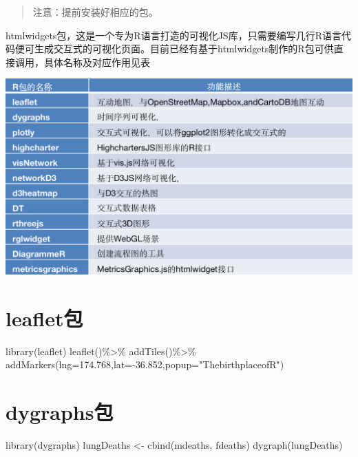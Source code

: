 \documentclass[
]{book}
\newenvironment{Shaded}{\begin{snugshade}}{\end{snugshade}}
\newcommand{\AttributeTok}[1]{\textcolor[rgb]{0.77,0.63,0.00}{#1}}
\newcommand{\FloatTok}[1]{\textcolor[rgb]{0.00,0.00,0.81}{#1}}
\newcommand{\FunctionTok}[1]{\textcolor[rgb]{0.00,0.00,0.00}{#1}}
\newcommand{\NormalTok}[1]{#1}
\newcommand{\OtherTok}[1]{\textcolor[rgb]{0.56,0.35,0.01}{#1}}
\newcommand{\SpecialCharTok}[1]{\textcolor[rgb]{0.00,0.00,0.00}{#1}}
\newcommand{\StringTok}[1]{\textcolor[rgb]{0.31,0.60,0.02}{#1}}
\begin{document}
\begin{quote}
注意：提前安装好相应的包。
\end{quote}

htmlwidgets包，这是一个专为R语言打造的可视化JS库，只需要编写几行R语言代码便可生成交互式的可视化页面。目前已经有基于htmlwidgets制作的R包可供直接调用，具体名称及对应作用见表

\includegraphics{figure/24.png}

\hypertarget{leafletux5305}{%
\section{leaflet包}\label{leafletux5305}}

\begin{Shaded}
\begin{Highlighting}[]
\FunctionTok{library}\NormalTok{(leaflet)}
\FunctionTok{leaflet}\NormalTok{()}\SpecialCharTok{\%\textgreater{}\%}
  \FunctionTok{addTiles}\NormalTok{()}\SpecialCharTok{\%\textgreater{}\%}
  \FunctionTok{addMarkers}\NormalTok{(}\AttributeTok{lng=}\FloatTok{174.768}\NormalTok{,}\AttributeTok{lat=}\SpecialCharTok{{-}}\FloatTok{36.852}\NormalTok{,}\AttributeTok{popup=}\StringTok{"ThebirthplaceofR"}\NormalTok{)}
\end{Highlighting}
\end{Shaded}

\hypertarget{dygraphsux5305}{%
\section{dygraphs包}\label{dygraphsux5305}}

\begin{Shaded}
\begin{Highlighting}[]
\FunctionTok{library}\NormalTok{(dygraphs)}
\NormalTok{lungDeaths }\OtherTok{\textless{}{-}} \FunctionTok{cbind}\NormalTok{(mdeaths, fdeaths)}
\FunctionTok{dygraph}\NormalTok{(lungDeaths)}
\end{Highlighting}
\end{Shaded}
\end{document}
